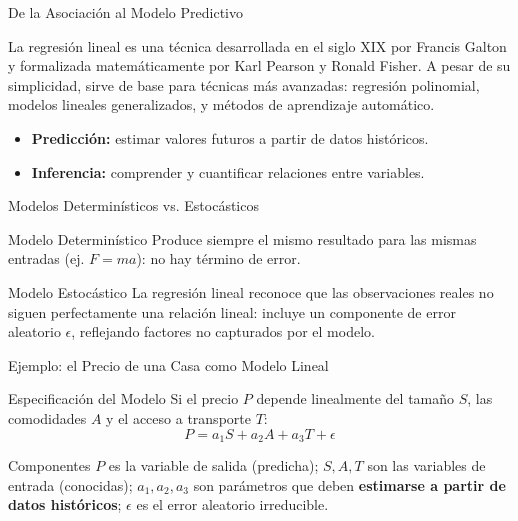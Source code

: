 \documentclass[10pt, aspectratio=169]{beamer}
\begin{document}
\begin{frame}{De la Asociación al Modelo Predictivo}
  \footnotesize
  \begin{motivacion}
    La regresión lineal es una técnica desarrollada en el siglo XIX por Francis Galton y formalizada matemáticamente por Karl Pearson y Ronald Fisher. A pesar de su simplicidad, sirve de base para técnicas más avanzadas: regresión polinomial, modelos lineales generalizados, y métodos de aprendizaje automático.
  \end{motivacion}

  \vspace{0.15cm}
  \pause
  \begin{itemize}\itemsep=0.1cm
    \item \textbf{Predicción:} estimar valores futuros a partir de datos históricos. \pause
    \item \textbf{Inferencia:} comprender y cuantificar relaciones entre variables.
  \end{itemize}
\end{frame}

\begin{frame}{Modelos Determinísticos vs. Estocásticos}
  \footnotesize
  \begin{block}{Modelo Determinístico}
    Produce siempre el mismo resultado para las mismas entradas (ej. $F=ma$): no hay término de error.
  \end{block}
  \pause

  \vspace{0.1cm}
  \begin{alertblock}{Modelo Estocástico}
    La regresión lineal reconoce que las observaciones reales no siguen perfectamente una relación lineal: incluye un componente de error aleatorio $\epsilon$, reflejando factores no capturados por el modelo.
  \end{alertblock}
\end{frame}

\begin{frame}{Ejemplo: el Precio de una Casa como Modelo Lineal}
  \footnotesize
  \begin{block}{Especificación del Modelo}
    Si el precio $P$ depende linealmente del tamaño $S$, las comodidades $A$ y el acceso a transporte $T$:
    $$P = a_1 S + a_2 A + a_3 T + \epsilon$$
  \end{block}
  \pause

  \vspace{0.1cm}
  \begin{alertblock}{Componentes}
    $P$ es la variable de salida (predicha); $S,A,T$ son las variables de entrada (conocidas); $a_1,a_2,a_3$ son parámetros que deben \textbf{estimarse a partir de datos históricos}; $\epsilon$ es el error aleatorio irreducible.
  \end{alertblock}
\end{frame}
\end{document}
